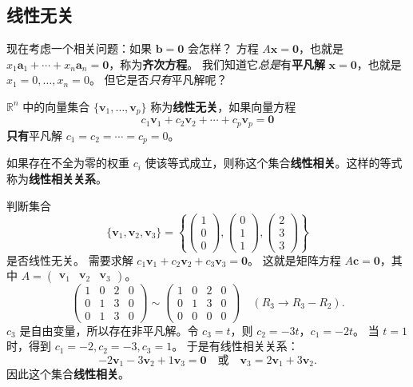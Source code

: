 \subsection{线性无关}
现在考虑一个相关问题：如果 $\mathbf{b}=\mathbf{0}$ 会怎样？
方程 $A\mathbf{x}=\mathbf{0}$，也就是 $x_1\mathbf{a}_1+\cdots+x_n\mathbf{a}_n=\mathbf{0}$，称为\textbf{齐次方程}。
我们知道它\emph{总是}有\textbf{平凡解} $\mathbf{x}=\mathbf{0}$，也就是 $x_1=0,\ldots,x_n=0$。
但它是否\emph{只有}平凡解呢？

\begin{definition}
$\mathbb{R}^n$ 中的向量集合 $\{\mathbf{v}_1,\ldots,\mathbf{v}_p\}$ 称为\textbf{线性无关}，如果向量方程
\[ c_1\mathbf{v}_1+c_2\mathbf{v}_2+\cdots+c_p\mathbf{v}_p=\mathbf{0} \]
\textbf{只有}平凡解 $c_1=c_2=\cdots=c_p=0$。

如果存在不全为零的权重 $c_i$ 使该等式成立，则称这个集合\textbf{线性相关}。这样的等式称为\textbf{线性相关关系}。
\end{definition}

\begin{example}
判断集合
\[
\{\mathbf{v}_1,\mathbf{v}_2,\mathbf{v}_3\}=\left\{\begin{pmatrix}1\\0\\0\end{pmatrix},\begin{pmatrix}0\\1\\1\end{pmatrix},\begin{pmatrix}2\\3\\3\end{pmatrix}\right\}
\]
是否线性无关。
需要求解 $c_1\mathbf{v}_1+c_2\mathbf{v}_2+c_3\mathbf{v}_3=\mathbf{0}$。
这就是矩阵方程 $A\mathbf{c}=\mathbf{0}$，其中 $A=\begin{pmatrix}\mathbf{v}_1&\mathbf{v}_2&\mathbf{v}_3\end{pmatrix}$。
\[
\left(\begin{array}{ccc|c}1&0&2&0\\0&1&3&0\\0&1&3&0\end{array}\right)
\sim
\left(\begin{array}{ccc|c}1&0&2&0\\0&1&3&0\\0&0&0&0\end{array}\right)\quad(R_3\to R_3-R_2).
\]
$c_3$ 是自由变量，所以存在非平凡解。令 $c_3=t$，则 $c_2=-3t$，$c_1=-2t$。
当 $t=1$ 时，得到 $c_1=-2,c_2=-3,c_3=1$。
于是有线性相关关系：
\[
-2\mathbf{v}_1-3\mathbf{v}_2+1\mathbf{v}_3=\mathbf{0}\quad\text{或}\quad \mathbf{v}_3=2\mathbf{v}_1+3\mathbf{v}_2.
\]
因此这个集合\textbf{线性相关}。
\end{example}

